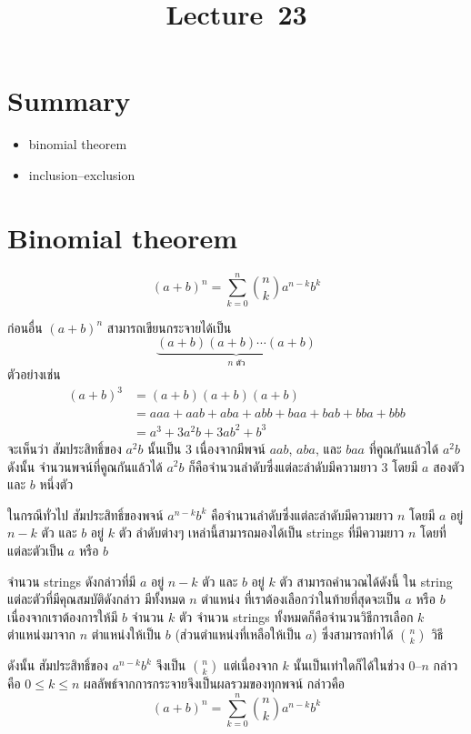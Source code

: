 \documentclass[a4paper,12pt,twoside]{article}
\title{Lecture~23}
\begin{document}
\header

\section*{Summary}
\begin{itemize}
\item binomial theorem
\item inclusion--exclusion
\end{itemize}

\section{Binomial theorem}
\begin{theorem}
\[(a+b)^n=\sum_{k=0}^{n}{\binom{n}{k}a^{n-k}b^k}\]
\begin{pf}
ก่อนอื่น $(a+b)^n$ สามารถเขียนกระจายได้เป็น \[\underbrace{(a+b)(a+b)\cdots(a+b)}_{\text{$n$ ตัว}}\]
ตัวอย่างเช่น 
\begin{align*}
(a+b)^3
&=(a+b)(a+b)(a+b) \\
&=aaa+aab+aba+abb+baa+bab+bba+bbb \\
&=a^3+3a^2b+3ab^2+b^3
\end{align*}
จะเห็นว่า สัมประสิทธิ์ของ $a^2b$ นั้นเป็น 3 เนื่องจากมีพจน์ $aab$, $aba$, และ $baa$ ที่คูณกันแล้วได้ $a^2b$ \enskip ดังนั้น จำนวนพจน์ที่คูณกันแล้วได้ $a^2b$ ก็คือจำนวนลำดับซึ่งแต่ละลำดับมีความยาว 3 โดยมี $a$ สองตัวและ $b$ หนึ่งตัว

ในกรณีทั่วไป สัมประสิทธิ์ของพจน์ $a^{n-k}b^k$ คือจำนวนลำดับซึ่งแต่ละลำดับมีความยาว $n$ โดยมี $a$ อยู่ $n-k$ ตัว และ $b$ อยู่ $k$ ตัว \enskip ลำดับต่างๆ เหล่านี้สามารถมองได้เป็น strings ที่มีความยาว $n$ โดยที่แต่ละตัวเป็น $a$ หรือ $b$

จำนวน strings ดังกล่าวที่มี $a$ อยู่ $n-k$ ตัว และ $b$ อยู่ $k$ ตัว สามารถคำนวณได้ดังนี้ \enskip ใน string แต่ละตัวที่มีคุณสมบัติดังกล่าว มีทั้งหมด $n$ ตำแหน่ง ที่เราต้องเลือกว่าในท้ายที่สุดจะเป็น $a$ หรือ $b$ \enskip เนื่องจากเราต้องการให้มี $b$ จำนวน $k$ ตัว จำนวน strings ทั้งหมดก็คือจำนวนวิธีการเลือก $k$ ตำแหน่งมาจาก $n$ ตำแหน่งให้เป็น $b$ (ส่วนตำแหน่งที่เหลือให้เป็น $a$) ซึ่งสามารถทำได้ $\binom{n}{k}$ วิธี

ดังนั้น สัมประสิทธิ์ของ $a^{n-k}b^k$ จึงเป็น $\binom{n}{k}$ แต่เนื่องจาก $k$ นั้นเป็นเท่าใดก็ได้ในช่วง 0--$n$ กล่าวคือ $0\leq k\leq n$ ผลลัพธ์จากการกระจายจึงเป็นผลรวมของทุกพจน์ กล่าวคือ
\[(a+b)^n=\sum_{k=0}^{n}{\binom{n}{k}a^{n-k}b^k}\]
\end{pf}
\end{theorem}
\end{document}
